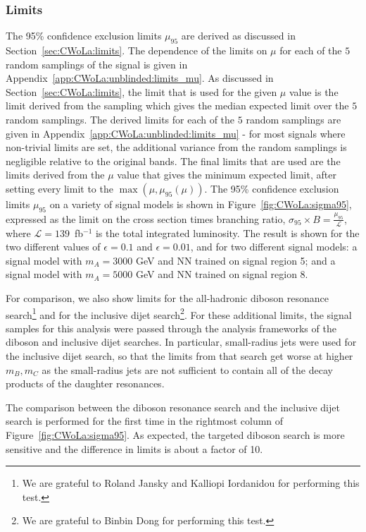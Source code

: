 \subsubsection{Limits}
\label{sec:CWoLa:unblinded:limits}
The 95\% confidence exclusion limits $\mu_{95}$ are derived as discussed in Section~\ref{sec:CWoLa:limits}. The dependence of the limits on $\mu$ for each of the $5$ random samplings of the signal is given in Appendix~\ref{app:CWoLa:unblinded:limits_mu}.
As discussed in Section~\ref{sec:CWoLa:limits}, the limit that is used for the given $\mu$ value is the limit derived from the sampling which gives the median expected limit over the $5$ random samplings.
The derived limits for each of the $5$ random samplings are given in Appendix~\ref{app:CWoLa:unblinded:limits_mu} - for most signals where non-trivial limits are set, the additional variance from the random samplings is negligible relative to the original bands.
The final limits that are used are the limits derived from the $\mu$ value that gives the minimum expected limit, after setting every limit to the $\max(\mu,\mu_{95}(\mu))$. 
The 95\% confidence exclusion limits $\mu_{95}$ on a variety of signal models is shown in Figure~\ref{fig:CWoLa:sigma95}, expressed as the limit on the cross section times branching ratio, $\sigma_{95}\times B = \frac{\mu_{95}}{\mathcal{L}}$, where $\mathcal{L} = 139$~fb$^{-1}$ is the total integrated luminosity.
The result is shown for the two different values of $\epsilon=0.1$ and $\epsilon=0.01$, and for two different signal models: a signal model with $m_A=3000$ GeV and NN trained on signal region 5; and a signal model with $m_A=5000$ GeV and NN trained on signal region 8.

For comparison, we also show limits for the all-hadronic diboson resonance search\footnote{We are grateful to Roland Jansky and Kalliopi Iordanidou for performing this test.} and for the inclusive dijet search\footnote{We are grateful to Binbin Dong for performing this test.}.
For these additional limits, the signal samples for this analysis were passed through the analysis frameworks of the diboson and inclusive dijet searches.
In particular, small-radius jets were used for the inclusive dijet search, so that the limits from that search get worse at higher $m_B,m_C$ as the small-radius jets are not sufficient to contain all of the decay products of the daughter resonances.

The comparison between the diboson resonance search and the inclusive dijet search is performed for the first time in the rightmost column of Figure~\ref{fig:CWoLa:sigma95}.
As expected, the targeted diboson search is more sensitive and the difference in limits is about a factor of 10.

